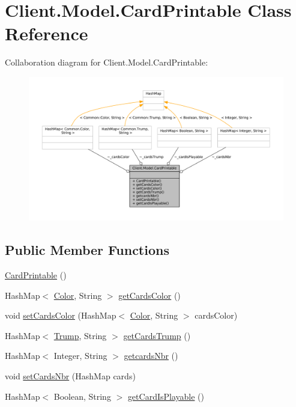 \hypertarget{classClient_1_1Model_1_1CardPrintable}{}\section{Client.\+Model.\+Card\+Printable Class Reference}
\label{classClient_1_1Model_1_1CardPrintable}


Collaboration diagram for Client.\+Model.\+Card\+Printable\+:
\nopagebreak
\begin{figure}[H]
\begin{center}
\leavevmode
\includegraphics[width=350pt]{classClient_1_1Model_1_1CardPrintable__coll__graph}
\end{center}
\end{figure}
\subsection*{Public Member Functions}
\begin{DoxyCompactItemize}
\item 
\mbox{\hyperlink{classClient_1_1Model_1_1CardPrintable_a0d5529a8f38150b8247987de25e211f1}{Card\+Printable}} ()
\item 
Hash\+Map$<$ \mbox{\hyperlink{enumCommon_1_1Color}{Color}}, String $>$ \mbox{\hyperlink{classClient_1_1Model_1_1CardPrintable_a4e25b9c9e2f896c38226b90f6d70c3e1}{get\+Cards\+Color}} ()
\item 
void \mbox{\hyperlink{classClient_1_1Model_1_1CardPrintable_a274cad3b9d126733b8836925bf78fdcc}{set\+Cards\+Color}} (Hash\+Map$<$ \mbox{\hyperlink{enumCommon_1_1Color}{Color}}, String $>$ cards\+Color)
\item 
Hash\+Map$<$ \mbox{\hyperlink{enumCommon_1_1Trump}{Trump}}, String $>$ \mbox{\hyperlink{classClient_1_1Model_1_1CardPrintable_a2ea1954ac7f7d1e7d5722ca9ec3e47ec}{get\+Cards\+Trump}} ()
\item 
Hash\+Map$<$ Integer, String $>$ \mbox{\hyperlink{classClient_1_1Model_1_1CardPrintable_a822c686854b07df2db3081343f72ea72}{getcards\+Nbr}} ()
\item 
void \mbox{\hyperlink{classClient_1_1Model_1_1CardPrintable_a6a0d91fd25888e5db9c9ad82ea924c76}{set\+Cards\+Nbr}} (Hash\+Map cards)
\item 
Hash\+Map$<$ Boolean, String $>$ \mbox{\hyperlink{classClient_1_1Model_1_1CardPrintable_a632c8e7ba57e3ad447add89a99ee78f7}{get\+Card\+Is\+Playable}} ()
\end{DoxyCompactItemize}



